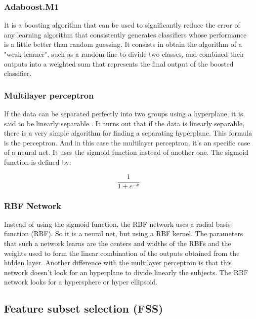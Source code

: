 \documentclass[conference,a4paper]{IEEEtran}
\begin{document}
\subsubsection{Adaboost.M1 \cite{Adaboost}}

It is a boosting algorithm that can be used to significantly reduce the error of any learning algorithm that consistently generates classifiers whose performance is a little better than random guessing. It consists in obtain the algorithm of a "weak learner", such as a random line to divide two classes, and combined their outputs into a weighted sum that represents the final output of the boosted classifier.

\subsubsection{Multilayer perceptron}

If the data can be separated perfectly into two groups using a hyperplane, it is said to be linearly separable \cite{DataMining}. It turns out that if the data is linearly separable, there is a very simple algorithm for finding a separating hyperplane. This formula is the perceptron. And in this case the multilayer perceptron, it's an specific case of a neural net. It uses the sigmoid function instead of another one. The sigmoid function is defined by:

\begin{equation}
\frac{1}{1+e^{-x}}
\end{equation}

\subsubsection{RBF Network}

Instead of using the sigmoid function, the RBF network uses a radial basis function (RBF). So it is a neural net, but using a RBF kernel. The parameters that such a network learns are the centers and widths of the RBFs and the weights used to form the linear combination of the outputs obtained from the hidden layer. Another difference with the multilayer perceptron is that this network doesn't look for an hyperplane to divide linearly the subjects. The RBF network looks for a hypersphere or hyper	ellipsoid. 

\subsection{Feature subset selection (FSS)}
\end{document}

